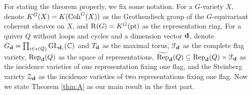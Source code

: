 For stating the theorem properly, we fix some notation. For a $G$-variety $X$, denote $K^G(X)=K(\operatorname{\operatorname{Coh}}^G(X))$ as the Grothendieck group of the $G$-equivariant coherent sheaves on $X$, and $\operatorname{\operatorname{R}}(G)=K^G(\operatorname{\operatorname{pt}})$ as the representation ring. For a quiver $Q$ without loops and cycles and a dimension vector $\mathbf{d}$, denote $G_{\mathbf{d}}=\prod_{i \in v(Q)} \operatorname{\operatorname{GL}}_{\mathbf{d}_i}(\mathbb{C})$ and $T_{\mathbf{d}}$ as the maximal torus, $\mathcal{F}_{\mathbf{d}}$ as the complete flag variety, $\operatorname{\operatorname{Rep}}_{\mathbf{d}}(Q)$ as the space of representations, $\operatorname{\widetilde{\operatorname{Rep}}}_{\mathbf{d}}(Q) \subseteq \operatorname{\operatorname{Rep}}_{\mathbf{d}}(Q) \times \mathcal{F}_{\mathbf{d}}$ as the incidence varieties of one representation fixing one flag, and the Steinberg variety $\operatorname{\mathcal{Z}}_{\mathbf{d}}$ as the incidence varieties of two representations fixing one flag. Now we state Theorem \ref{thm:A} as our main result in the first part.
